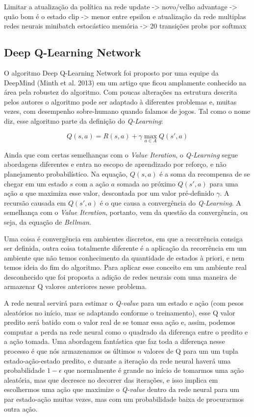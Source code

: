 \documentclass[letterpaper]{article} %
\begin{document}
Limitar a atualização da política na rede
update -> novo/velho
advantage -> quão bom é o estado
clip -> menor entre epsilon e atualização da rede
multiplas redes neurais
minibatch estocástico
memória -> 20 transições
probs por softmax




\subsection{Deep Q-Learning Network}
O algoritmo Deep Q-Learning Network foi proposto por uma equipe da DeepMind (Minth et al. 2013) em um artigo que ficou amplamente conhecido na área pela robustez do algoritmo. Com poucas alterações na estrutura descrita pelos autores o algoritmo pode ser adaptado à diferentes problemas e, muitas vezes, com desempenho sobre-humano quando falamos de jogos. Tal como o nome diz, esse algoritmo parte da definição do \textit{Q-Learning}:

$$
Q(s,a) = R(s,a) + \gamma \max_{a \in A} Q(s',a)
$$

Ainda que com certas semelhanças com o \textit{Value Iteration}, o \textit{Q-Learning} segue abordagens diferentes e entra no escopo de aprendizado por reforço, e não planejamento probabilístico. Na equação, $Q(s,a)$ é a soma da recompensa de se chegar em um estado $s$ com a ação $a$ somada ao próximo $Q(s',a)$ para uma ação $a$ que maximiza esse valor, descontada por um valor pré-definido $\gamma$. A recursão causada em $Q(s',a)$ é o que causa a convergência do \textit{Q-Learning}. A semelhança com o \textit{Value Iteration}, portanto, vem da questão da convergência, ou seja, da equação de \textit{Bellman}.

Uma coisa é convergência em ambientes discretos, em que a recorrência consiga ser definida, outra coisa totalmente diferente é a aplicação da recorrência em um ambiente que não temos conhecimento da quantidade de estados à priori, e nem temos ideia do fim do algoritmo. Para aplicar esse conceito em um ambiente real desconhecido que foi proposta a adição de redes neurais com uma maneira de armazenar Q valores anteriores nesse problema.

A rede neural servirá para estimar o \textit{Q-value} para um estado e ação (com pesos aleatórios no início, mas se adaptando conforme o treinamento), esse Q valor predito será batido com o valor real de se tomar essa ação e, assim, podemos computar a perda na rede neural como o quadrado da diferença entre o predito e a ação tomada. Uma abordagem fantástica que faz toda a diferença nesse processo é que nós armazenamos os últimos $n$ valores de Q para um um tupla estado-ação-estado predito, e durante a iteração da rede neural haverá uma probabilidade $1-\epsilon$ que normalmente é grande no início de tomarmos uma ação aleatória, mas que decresce no decorrer das iterações, e isso implica em escolhermos uma ação que maximize o \textit{Q-value} dentro da rede neural para um par estado-ação muitas vezes, mas com um probabilidade baixa de procurarmos outra ação.
\end{document}
